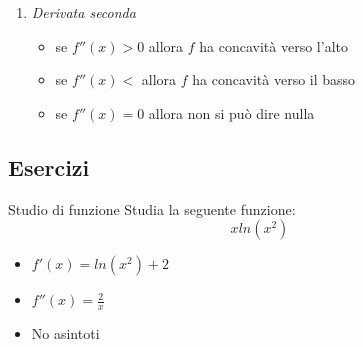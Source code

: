 \begin{enumerate}
\begin{itemize}
		      \item se $ f'\left(x\right) = 0 $ allora ho 3 opzioni:
		            \begin{itemize}
			            \item Punto di minimo locale/assoluto
			            \item Punto di massimo locale/assoluto
			            \item Flesso a tangenza orizzontale
		            \end{itemize}
	      \end{itemize}
	\item \textit{Derivata seconda}
	      \begin{itemize}
		      \item se $ f''\left(x\right) > 0 $ allora $ f $ ha concavità verso l'alto
		      \item se $ f''\left(x\right) < $ allora $ f $ ha concavità verso il basso
		      \item se $ f''\left(x\right) = 0 $ allora non si può dire nulla
	      \end{itemize}
\end{enumerate}
\subsection{Esercizi}
\begin{esercizio}{Studio di funzione}
	Studia la seguente funzione:
	\[
		x ln\left(x^2 \right)
	\]
\end{esercizio}
\vskip3mm
\begin{itemize}
	\item $ f'\left(x\right) = ln\left(x^2 \right) + 2 $
	\item $ f''\left(x\right) = \frac{2}{x} $
	\item No asintoti
\end{itemize}


